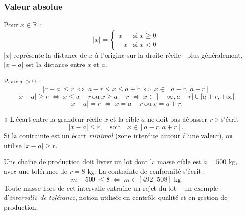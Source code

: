\documentclass[12pt,a4paper]{article}
\begin{document}
\subsubsection{Valeur absolue}

\begin{definitionbox}
Pour $x \in \mathbb{R}$ :
$$|x| = \begin{cases} x & \text{si } x \geqslant 0 \\ -x & \text{si } x < 0 \end{cases}$$
$|x|$ représente la distance de $x$ à l'origine sur la droite réelle ; plus généralement, $|x-a|$ est la distance entre $x$ et $a$.
\end{definitionbox}

\begin{propbox}
Pour $r>0$ :
$$|x-a| \leqslant r \;\Longleftrightarrow\; a-r \leqslant x \leqslant a+r \;\Longleftrightarrow\; x \in [a-r,\, a+r]$$
$$|x-a| \geqslant r \;\Longleftrightarrow\; x \leqslant a-r \ \text{ou}\ x \geqslant a+r \;\Longleftrightarrow\; x\in\,]-\infty,a-r]\cup[a+r,+\infty[$$
$$|x-a| = r \;\Longleftrightarrow\; x=a-r \ \text{ou}\ x=a+r.$$
\end{propbox}

\begin{methodebox}
« L'écart entre la grandeur réelle $x$ et la cible $a$ ne doit pas dépasser $r$ » s'écrit
$$|x-a|\leqslant r, \quad \text{soit}\quad x\in[a-r,a+r].$$
Si la contrainte est un écart \emph{minimal} (zone interdite autour d'une valeur), on utilise $|x-a|\geqslant r$.
\end{methodebox}

\begin{gestionbox}
Une chaîne de production doit livrer un lot dont la masse cible est $a = 500$ kg, avec une tolérance de $r = 8$ kg. La contrainte de conformité s'écrit :
$$|m - 500| \leqslant 8 \;\Longleftrightarrow\; m \in [492,\,508] \text{ kg.}$$
Toute masse hors de cet intervalle entraîne un rejet du lot -- un exemple d'\emph{intervalle de tolérance}, notion utilisée en contrôle qualité et en gestion de production.
\end{gestionbox}

\begin{center}
\end{center}
\end{document}
